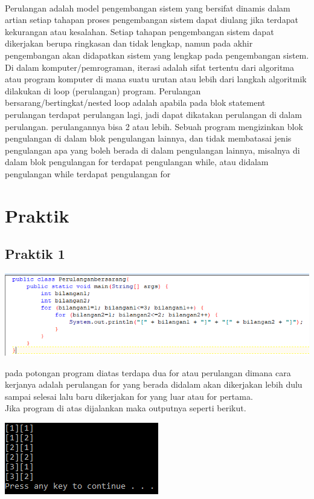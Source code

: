 \documentclass[a4paper,12pt]{article}
\begin{document}
\paragraph{}
Perulangan adalah model pengembangan sistem yang bersifat dinamis dalam artian
setiap tahapan proses pengembangan sistem dapat diulang jika terdapat kekurangan
atau kesalahan. Setiap tahapan pengembangan sistem dapat dikerjakan berupa
ringkasan dan tidak lengkap, namun pada akhir pengembangan akan didapatkan sistem
yang lengkap pada pengembangan sistem.
Di dalam komputer/pemrograman, iterasi adalah sifat tertentu dari algoritma atau
program komputer di mana suatu urutan atau lebih dari langkah algoritmik dilakukan di
loop (perulangan) program.
Perulangan bersarang/bertingkat/nested loop adalah apabila pada blok statement
perulangan terdapat perulangan lagi, jadi dapat dikatakan perulangan di dalam
perulangan. perulangannya bisa 2 atau lebih.
Sebuah program mengizinkan blok pengulangan di dalam blok pengulangan lainnya, dan
tidak membatasai jenis pengulangan apa yang boleh berada di dalam pengulangan
lainnya, misalnya di dalam blok pengulangan for terdapat pengulangan while, atau didalam pengulangan while terdapat pengulangan for

\newpage
\section{Praktik}
\subsection{Praktik 1}
\begin{center}
	\includegraphics[scale=.7]{Capture1}
\end{center}
pada potongan program diatas terdapa dua for atau perulangan dimana cara kerjanya adalah perulangan for yang berada didalam akan dikerjakan lebih dulu sampai selesai lalu baru dikerjakan for yang luar atau for pertama.\\
Jika program di atas dijalankan maka outputnya seperti berikut.
\begin{center}
	\includegraphics[scale=.7]{Capture2}
\end{center}
\end{document}
